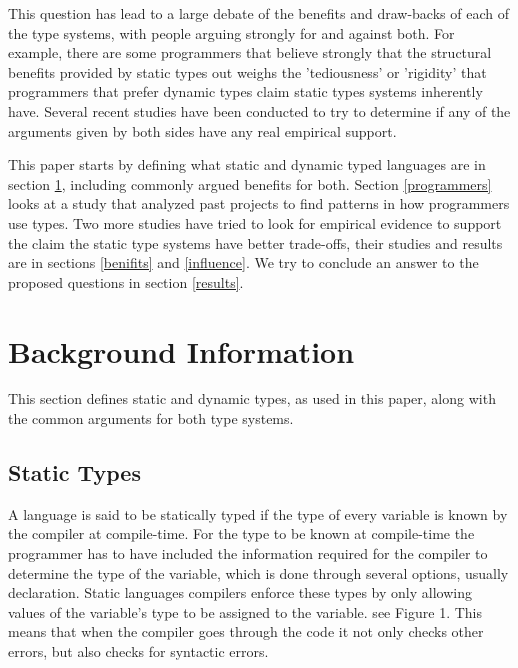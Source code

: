 \documentclass{sig-alternate}
\begin{document}
This question has lead to a large debate of the benefits and draw-backs of each of the type systems, with people arguing strongly for and against both. For example, there are some programmers that believe strongly that the structural benefits provided by static types out weighs the 'tediousness' or 'rigidity' that programmers that prefer dynamic types claim static types systems inherently have.   
Several recent studies have been conducted to try to determine if any of the arguments given by both sides have any real empirical support. 

This paper starts by defining what static and dynamic typed languages are in section \ref{types}, including commonly argued benefits for both. Section \ref{programmers} looks at a study that analyzed past projects to find patterns in how programmers use types. Two more studies have tried to look for empirical evidence to support the claim the static type systems have better trade-offs, their studies and results are in sections \ref{benifits} and \ref{influence}. We try to conclude an answer to the proposed questions in section \ref{results}.

\section{Background Information}\label{types}
This section defines static and dynamic types, as used in this paper, along with the common arguments for both type systems. %

\subsection{Static Types}\label{static}
A language is said to be statically typed if the type of every variable is known by the compiler at compile-time. For the type to be known at compile-time the programmer has to have included the information required for the compiler to determine the type of the variable, which is done through several options, usually declaration. Static languages compilers enforce these types by only allowing values of the variable's type to be assigned to the variable. see Figure 1. This means that when the compiler goes through the code it not only checks other errors, but also checks for syntactic errors.
 
\end{document}
